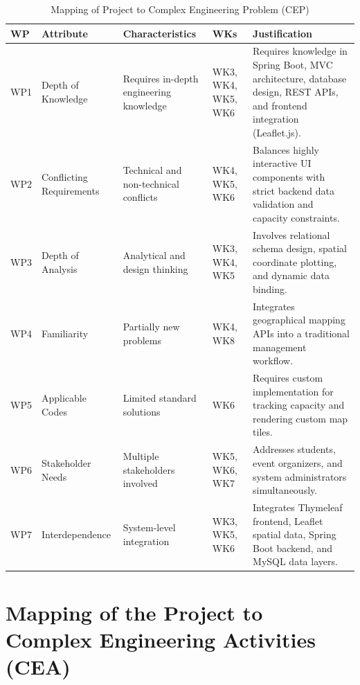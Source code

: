 \documentclass[10pt]{report}
\begin{document}
\begin{table}[h]
\centering
\caption{Mapping of Project to Complex Engineering Problem (CEP)}

\begin{tabular}{|p{1cm}|p{3cm}|p{3cm}|p{2cm}|p{6cm}|}
\hline
\textbf{WP} & \textbf{Attribute} & \textbf{Characteristics} & \textbf{WKs} & \textbf{Justification} \\ \hline

WP1 & Depth of Knowledge & Requires in-depth engineering knowledge & WK3, WK4, WK5, WK6 & Requires knowledge in Spring Boot, MVC architecture, database design, REST APIs, and frontend integration (Leaflet.js). \\ \hline

WP2 & Conflicting Requirements & Technical and non-technical conflicts & WK4, WK5, WK6 & Balances highly interactive UI components with strict backend data validation and capacity constraints. \\ \hline

WP3 & Depth of Analysis & Analytical and design thinking & WK3, WK4, WK5 & Involves relational schema design, spatial coordinate plotting, and dynamic data binding. \\ \hline

WP4 & Familiarity & Partially new problems & WK4, WK8 & Integrates geographical mapping APIs into a traditional management workflow. \\ \hline

WP5 & Applicable Codes & Limited standard solutions & WK6 & Requires custom implementation for tracking capacity and rendering custom map tiles. \\ \hline

WP6 & Stakeholder Needs & Multiple stakeholders involved & WK5, WK6, WK7 & Addresses students, event organizers, and system administrators simultaneously. \\ \hline

WP7 & Interdependence & System-level integration & WK3, WK5, WK6 & Integrates Thymeleaf frontend, Leaflet spatial data, Spring Boot backend, and MySQL data layers. \\ \hline

\end{tabular}

\end{table}
\newpage
\section{Mapping of the Project to Complex Engineering Activities (CEA)}
\end{document}
